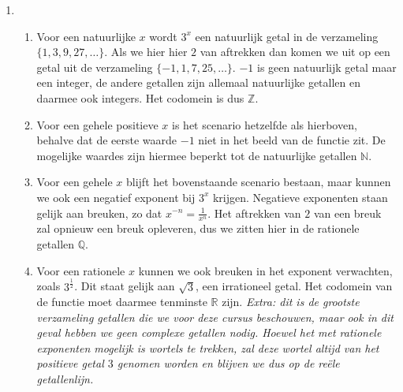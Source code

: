 \begin{answer}
\begin{enumerate}[label=\textbf{\alph*.}]
    \item \begin{enumerate}
        \item Voor een natuurlijke $x$ wordt $3^{x}$ een natuurlijk getal in de verzameling $\{ 1, 3, 9, 27, \dots \}$. Als we hier hier $2$ van aftrekken dan komen we uit op een getal uit de verzameling $\{ -1, 1, 7, 25, \dots \}$. $-1$ is geen natuurlijk getal maar een integer, de andere getallen zijn allemaal natuurlijke getallen en daarmee ook integers. Het codomein is dus $\mathbb{Z}$.
        \item Voor een gehele positieve $x$ is het scenario hetzelfde als hierboven, behalve dat de eerste waarde $-1$ niet in het beeld van de functie zit. De mogelijke waardes zijn hiermee beperkt tot de natuurlijke getallen $\mathbb{N}$.

        \item Voor een gehele $x$ blijft het bovenstaande scenario bestaan, maar kunnen we ook een negatief exponent bij $3^{x}$ krijgen. Negatieve exponenten staan gelijk aan breuken, zo dat $x^{-n} = \frac{1}{x^{n}}$. Het aftrekken van $2$ van een breuk zal opnieuw een breuk opleveren, dus we zitten hier in de rationele getallen $\mathbb{Q}$.
        \item Voor een rationele $x$ kunnen we ook breuken in het exponent verwachten, zoals $3^{\frac{1}{2}}$. Dit staat gelijk aan $\sqrt{3}$, een irrationeel getal. Het codomein van de functie moet daarmee tenminste $\mathbb{R}$ zijn. \emph{Extra: dit is de grootste verzameling getallen die we voor deze cursus beschouwen, maar ook in dit geval hebben we geen complexe getallen nodig. Hoewel het met rationele exponenten mogelijk is wortels te trekken, zal deze wortel altijd van het positieve getal $3$ genomen worden en blijven we dus op de re\"{e}le getallenlijn.}
      \end{enumerate}

  \end{enumerate}
\end{answer}
